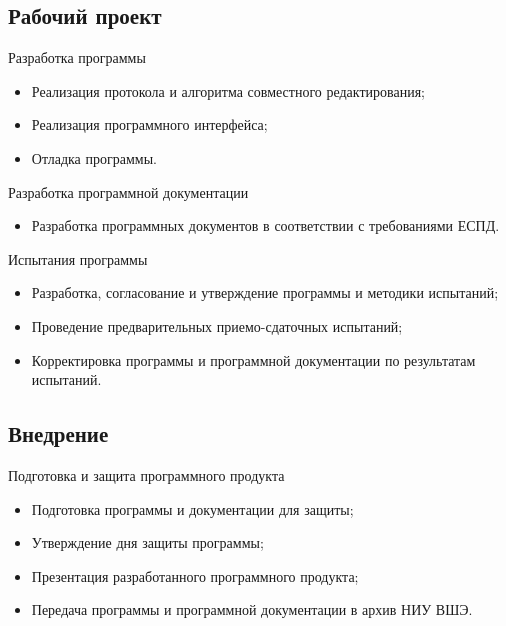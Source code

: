 \documentclass[a4paper,12pt,reqno]{article}
\begin{document}
    \subsection{Рабочий проект}
    Разработка программы
    \begin{itemize}
        \item Реализация протокола и алгоритма совместного редактирования;
        \item Реализация программного интерфейса;
        \item Отладка программы.
    \end{itemize}

    Разработка программной документации
    \begin{itemize}
        \item Разработка программных документов в соответствии с требованиями ЕСПД.
    \end{itemize}

    Испытания программы
    \begin{itemize}
        \item Разработка, согласование и утверждение программы и методики испытаний;
        \item Проведение предварительных приемо-сдаточных испытаний;
        \item Корректировка программы и программной документации по результатам испытаний.
    \end{itemize}

    \subsection{Внедрение}
    Подготовка и защита программного продукта
    \begin{itemize}
        \item Подготовка программы и документации для защиты;
        \item Утверждение дня защиты программы;
        \item Презентация разработанного программного продукта;
        \item Передача программы и программной документации в архив НИУ ВШЭ.
    \end{itemize}

    \newpage
\end{document}
